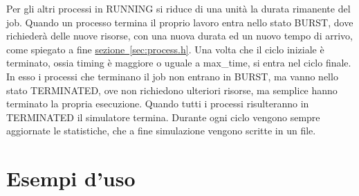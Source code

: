 \documentclass[Lau, oneside]{sapthesis}%
\begin{document}
Per gli altri processi in RUNNING si riduce di una unità la durata rimanente del job.
Quando un processo termina il proprio lavoro entra nello stato BURST, dove richiederà delle nuove risorse, con una nuova durata ed un nuovo tempo di arrivo, come spiegato a fine \hyperref[sec:process.h]{sezione~\ref*{sec:process.h}}.
Una volta che il ciclo iniziale è terminato, ossia timing è maggiore o uguale a max\_time, si entra nel ciclo finale.
In esso i processi che terminano il job non entrano in BURST, ma vanno nello stato TERMINATED, ove non richiedono ulteriori risorse, ma semplice hanno terminato la propria esecuzione.
Quando tutti i processi risulteranno in TERMINATED il simulatore termina.
Durante ogni ciclo vengono sempre aggiornate le statistiche, che a fine simulazione vengono scritte in un file.

\chapter{Esempi d'uso}
\label{chap:3}
\end{document}
